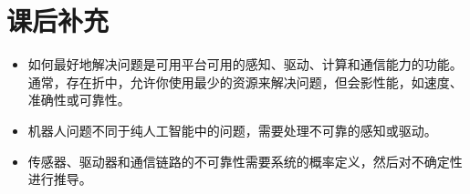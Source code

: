 \section*{课后补充}

\begin{itemize}
\item 如何最好地解决问题是可用平台可用的感知、驱动、计算和通信能力的功能。通常，存在折中，允许你使用最少的资源来解决问题，但会影性能，如速度、准确性或可靠性。
\item 机器人问题不同于纯人工智能中的问题，需要处理不可靠的感知或驱动。
\item 传感器、驱动器和通信链路的不可靠性需要系统的概率定义，然后对不确定性进行推导。
\end{itemize}


